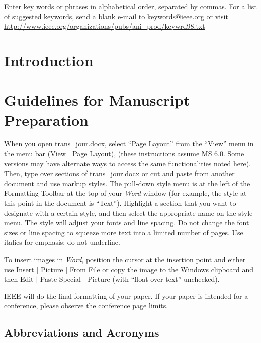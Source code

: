 \documentclass[journal]{IEEEtai}
\begin{document}
\begin{IEEEkeywords}
Enter key words or phrases in alphabetical order, separated by commas. For a list of suggested keywords, send a blank e-mail to \href{mailto:keywords@ieee.org}{\underline{keywords@ieee.org}} or visit \href{http://www.ieee.org/organizations/pubs/ani_prod/keywrd98.txt}{\underline{http://www.ieee.org/organizations/pubs/ani\_prod/keywrd98.txt}}
\end{IEEEkeywords}



\section{Introduction}



\section{Guidelines for Manuscript Preparation}

When you open trans\_jour.docx, select ``Page Layout'' from the ``View'' menu in the menu bar (View $|$ Page Layout), (these instructions assume MS 6.0. Some versions may have alternate ways to access the same functionalities noted here). Then, type over sections of trans\_jour.docx or cut and paste from another document and use markup styles. The pull-down style menu is at the left of the Formatting Toolbar at the top of your {\it Word} window (for example, the style at this point in the document is ``Text''). Highlight a section that you want to designate with a certain style, and then select the appropriate name on the style menu. The style will adjust your fonts and line spacing. Do not change the font sizes or line spacing to squeeze more text into a limited number of pages. Use italics for emphasis; do not underline.

To insert images in {\it Word}, position the cursor at the insertion point and either use Insert $|$ Picture $|$ From File or copy the image to the Windows clipboard and then Edit $|$ Paste Special $|$ Picture (with ``float over text'' unchecked). 

IEEE will do the final formatting of your paper. If your paper is intended for a conference, please observe the conference page limits.

\subsection{Abbreviations and Acronyms}
\end{document}
